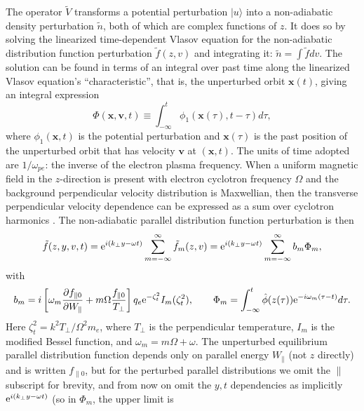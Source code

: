 \documentclass{jpp}
\def\ket#1{|#1\rangle}
\def\etothe#1{{\rm e}^{#1}}
\begin{document}
The operator $\tilde{V}$ transforms a potential perturbation $\ket{u}$
into a non-adiabatic density perturbation $\tilde n$, both of which
are complex functions of $z$. It does so by solving the linearized
time-dependent Vlasov equation for the non-adiabatic distribution
function perturbation $\tilde f(z,v)$ and integrating it:
$\tilde n =\int \tilde f dv$. The solution can be found in terms
of an integral over past time along the linearized Vlasov equation's
``characteristic'', that is, the unperturbed orbit $\bm x(t)$, giving
an integral expression
\begin{equation}
  \label{eq:phim}
  \Phi(\bm x,\bm v,t)\equiv 
  \int_{-\infty}^t \phi_1(\bm x(\tau),t-\tau ) d\tau,
\end{equation}
where $\phi_1(\bm x,t)$ is the potential perturbation and
$\bm x(\tau)$ is the past position of the unperturbed orbit that has
velocity $\bm v$ at $(\bm x,t)$. The units of time adopted are
$1/\omega_{pe}$: the inverse of the electron plasma frequency. When a
uniform magnetic field in the $z$-direction is present with electron
cyclotron frequency $\Omega$ and the background
perpendicular velocity distribution is Maxwellian, then the
transverse perpendicular velocity dependence can be expressed as a sum
over cyclotron harmonics
\citep{Hutchinson2018a}.  The non-adiabatic
parallel distribution function perturbation is then
\begin{equation}\label{eq:ftmagnetic}
    \tilde f(z,y,v,t) = {\rm e}^{i(k_\perp y-\omega t)}
    \sum_{m=-\infty}^\infty \tilde f_m(z,v)= {\rm e}^{i(k_\perp
      y-\omega t)} \sum_{m=-\infty}^\infty b_m \Phi_m,
\end{equation}
with
\begin{equation}
  \label{mweight}
   b_m=i\left[\omega_m
  {\partial f_{\parallel0}\over \partial W_\parallel}
  +m\Omega {f_{\parallel0}\over T_\perp}\right]
q_e{\rm e}^{-\zeta_t^2}I_m(\zeta_t^2),\qquad
\Phi_m=\int_{-\infty}^t \hat\phi(z(\tau))\etothe{-i\omega_m(\tau-t)}d\tau.
\end{equation}
Here $\zeta_t^2=k^2T_\perp/\Omega^2m_e$, where $T_\perp$ is the
perpendicular temperature, $I_m$ is the modified Bessel function, and
$\omega_m=m\Omega+\omega$. The unperturbed equilibrium parallel
distribution function depends only on parallel energy $W_\parallel$
(not $z$ directly) and is written $f_{\parallel 0}$, but for the
perturbed parallel distributions we omit the $\parallel$ subscript for
brevity, and from now on omit the $y,t$ dependencies as implicitly
$ {\rm e}^{i(k_\perp y-\omega t)}$ (so in $\Phi_m$, the upper limit is
\end{document}
